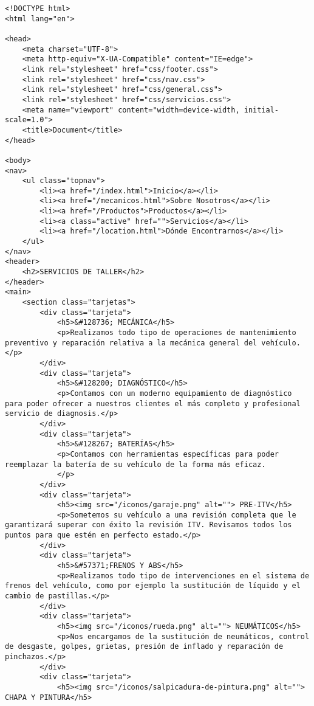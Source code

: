 \clearpage
\begin{lstlisting}[caption=servicios.html (LMSI)]
<!DOCTYPE html>
<html lang="en">

<head>
    <meta charset="UTF-8">
    <meta http-equiv="X-UA-Compatible" content="IE=edge">
    <link rel="stylesheet" href="css/footer.css">
    <link rel="stylesheet" href="css/nav.css">
    <link rel="stylesheet" href="css/general.css">
    <link rel="stylesheet" href="css/servicios.css">
    <meta name="viewport" content="width=device-width, initial-scale=1.0">
    <title>Document</title>
</head>

<body>
<nav>
    <ul class="topnav">
        <li><a href="/index.html">Inicio</a></li>
        <li><a href="/mecanicos.html">Sobre Nosotros</a></li>
        <li><a href="/Productos">Productos</a></li>
        <li><a class="active" href="">Servicios</a></li>
        <li><a href="/location.html">Dónde Encontrarnos</a></li>
    </ul>
</nav>
<header>
    <h2>SERVICIOS DE TALLER</h2>
</header>
<main>
    <section class="tarjetas">
        <div class="tarjeta">
            <h5>&#128736; MECÁNICA</h5>
            <p>Realizamos todo tipo de operaciones de mantenimiento preventivo y reparación relativa a la mecánica general del vehículo.</p>
        </div>
        <div class="tarjeta">
            <h5>&#128200; DIAGNÓSTICO</h5>
            <p>Contamos con un moderno equipamiento de diagnóstico para poder ofrecer a nuestros clientes el más completo y profesional servicio de diagnosis.</p>
        </div>
        <div class="tarjeta">
            <h5>&#128267; BATERÍAS</h5>
            <p>Contamos con herramientas específicas para poder reemplazar la batería de su vehículo de la forma más eficaz.
            </p>
        </div>
        <div class="tarjeta">
            <h5><img src="/iconos/garaje.png" alt=""> PRE-ITV</h5>
            <p>Sometemos su vehículo a una revisión completa que le garantizará superar con éxito la revisión ITV. Revisamos todos los puntos para que estén en perfecto estado.</p>
        </div>
        <div class="tarjeta">
            <h5>&#57371;FRENOS Y ABS</h5>
            <p>Realizamos todo tipo de intervenciones en el sistema de frenos del vehículo, como por ejemplo la sustitución de líquido y el cambio de pastillas.</p>
        </div>
        <div class="tarjeta">
            <h5><img src="/iconos/rueda.png" alt=""> NEUMÁTICOS</h5>
            <p>Nos encargamos de la sustitución de neumáticos, control de desgaste, golpes, grietas, presión de inflado y reparación de pinchazos.</p>
        </div>
        <div class="tarjeta">
            <h5><img src="/iconos/salpicadura-de-pintura.png" alt=""> CHAPA Y PINTURA</h5>

\end{lstlisting}
